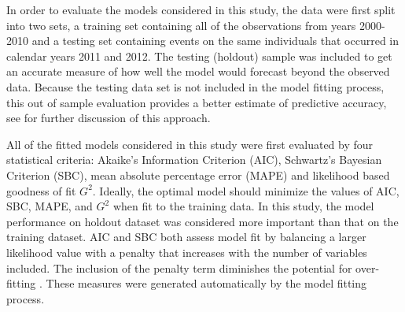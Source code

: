 In order to evaluate the models considered in this study, the data were first split into two sets, a training set containing all of the observations from years 2000-2010 and a testing set containing events on the same individuals that occurred in calendar years 2011 and 2012. The testing (holdout) sample was included to get an accurate measure of how well the model would forecast beyond the observed data.  Because the testing data set is not included in the model fitting process, this out of sample evaluation provides a better estimate of predictive accuracy, see \citet{kuhn2013} for further discussion of this approach.

All of the fitted models considered in this study were first evaluated by four statistical criteria:  Akaike’s Information Criterion (AIC), Schwartz’s Bayesian Criterion (SBC), mean absolute percentage error (MAPE) and likelihood based goodness of fit $G^2$. Ideally, the optimal model should minimize the values of AIC, SBC, MAPE, and $G^2$ when fit to the training data. In this study, the model performance on holdout dataset was considered more important than that on the training dataset.
AIC and SBC both assess model fit by balancing a larger likelihood value with a penalty that increases with the number of variables included. The inclusion of the penalty term diminishes the potential for over-fitting \citep{allison2010,hosmer2013}. These measures were generated automatically by the model fitting process.

